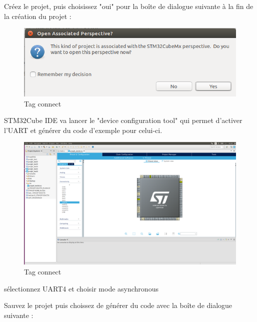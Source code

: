 \documentclass{article}
\begin{document}
Créez le projet, puis choisissez "oui" pour la boîte de dialogue suivante à la fin de la création du projet :
\begin{figure}[H]
\begin{center}
\advance\leftskip-3cm
\advance\rightskip-3cm
\includegraphics[keepaspectratio=true,scale=0.3]{end_projectcreation.png}
\caption{Tag connect}
\label{visina8}
\end{center}\end{figure}

STM32Cube IDE va lancer le "device configuration tool" qui permet d'activer l'UART et générer du code d'exemple pour celui-ci.

\begin{figure}[H]
\begin{center}
\advance\leftskip-3cm
\advance\rightskip-3cm
\includegraphics[keepaspectratio=true,scale=0.3]{configuration_tool.png}
\caption{Tag connect}
\label{visina8}
\end{center}\end{figure}

sélectionnez UART4 et choisir mode asynchronous

Sauvez le projet puis choissez de générer du code avec la boîte de dialogue suivante :
\end{document}
